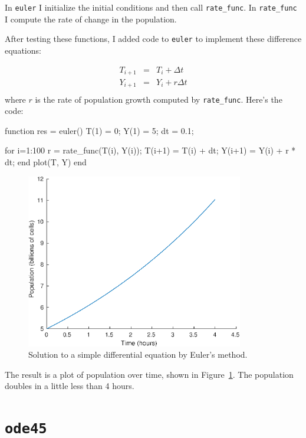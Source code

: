 \documentclass[
]{book}
\numberwithin{Answer}{chapter}
\numberwithin{Exercise}{chapter}
\begin{document}
In {\tt euler} I initialize the initial conditions and then call \verb"rate_func".  In \verb"rate_func" I compute the rate of change in the population.


After testing these functions, I added code to {\tt euler} to implement these difference equations:

\begin{eqnarray}
T_{i+1} &=& T_i + \Delta t             \\
Y_{i+1} &=& Y_i + r \Delta t           \\
\end{eqnarray}
%
where $r$ is the rate of population growth computed by \verb"rate_func".
Here's the code:

\begin{code}
function res = euler()
    T(1) = 0;
    Y(1) = 5;
    dt = 0.1;
    
    for i=1:100
        r = rate_func(T(i), Y(i));
        T(i+1) = T(i) + dt;
        Y(i+1) = Y(i) + r * dt;
    end
    plot(T, Y)
end
\end{code}

\begin{figure}
\centerline{\includegraphics[height=3in]{book/figs/euler.eps}}
\caption{Solution to a simple differential equation by Euler's method.}
\label{fig:euler}
\end{figure}

The result is a plot of population over time, shown in Figure~\ref{fig:euler}.  The population doubles in a little less than 4 hours.


\section{{\tt ode45}}
\label{sect:ode45}
\end{document}
